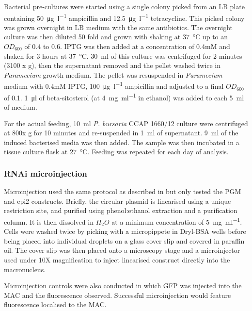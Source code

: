 Bacterial pre-cultures were started using a single colony picked from an LB
plate containing \SI{50}{\micro\gram\per\litre} ampicillin and \SI{12.5}{\micro\gram\per\litre} tetracycline.
This picked colony was grown overnight in LB medium with the same antibiotics.
The overnight culture was then diluted 50 fold and grown with shaking
at \SI{37}{\degreeCelsius} up to an \(OD_{600}\) of 0.4 to 0.6. IPTG
was then added at a concentration of 0.4mM and shaken for 3 hours
at \SI{37}{\degreeCelsius}.  \SI{30}{\milli\litre} of this culture was centrifuged for 
2 minutes (3100 x g),
then the supernatant removed and the pellet washed twice in \textit{Paramecium}
growth medium. The pellet was resuspended in \textit{Paramecium} medium with 0.4mM IPTG,
\SI{100}{\micro\gram\per\litre} ampicillin and adjusted to a final \(OD_{600}\) of 0.1.
\SI{1}{\micro\litre} of beta-sitosterol (at \SI{4}{\milli\gram\per\milli\litre} in ethanol) was added
to each \SI{5}{\milli\litre} of medium.

For the actual feeding, \SI{10}{\milli\litre} \textit{P. bursaria} CCAP 1660/12 culture
were centrifuged at 800x g for 10 minutes and re-suspended in \SI{1}{\milli\litre} of supernatant.
\SI{9}{\milli\litre} of the induced bacterised media was then added.  The sample was
then incubated in a tissue culture flask at \SI{27}{\degreeCelsius}.
Feeding was repeated for each day of analysis. 

\subsubsection{RNAi microinjection}

Microinjection used the same protocol as described in \citep{Beisson2010b} 
but only tested the PGM and epi2 constructs.
Briefly, the circular plasmid is linearised using a unique restriction site,
and purified using phenol:ethanol extraction and a purification column.
It is then dissolved in \(H_{2}O\) at a minimum concentration of 
\SI{5}{\milli\gram\per\milli\litre}.
Cells were washed twice by picking with a micropippete in Dryl-BSA wells before
being placed into individual droplets on a glass cover slip and covered in paraffin oil.
The cover slip was then placed onto a microscopy stage and a microinjector 
used under 10X magnification to inject linearised construct directly into the
macronucleus.

Microinjection controls were also conducted in which GFP was injected
into the MAC and the fluorescence observed.  Successful microinjection
would feature fluorescence localised to the MAC.

